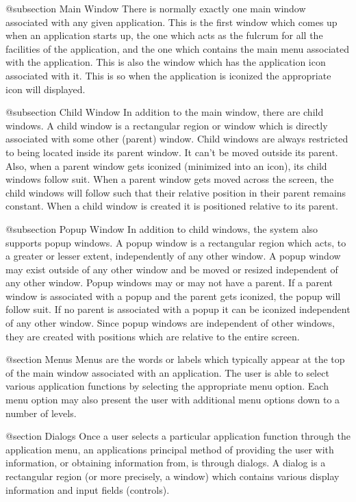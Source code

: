 @subsection Main Window
There is normally exactly one main window associated with any given
application.  This is the first window which comes up when an application
starts up, the one which acts as the fulcrum for all the facilities of
the application, and the one which contains the main menu associated with
the application.  This is also the window which has the application icon
associated with it.  This is so when the application is iconized the
appropriate icon will displayed.

@subsection Child Window
In addition to the main window, there are child windows.  A child window
is a rectangular region or window which is directly associated with
some other (parent) window.  Child windows are always restricted to being
located inside its parent window.  It can't be moved outside its parent.
Also, when a parent window gets iconized (minimized into an icon), its
child windows follow suit.  When a parent window gets moved across the
screen, the child windows will follow such that their relative position
in their parent remains constant.  When a child window is created it
is positioned relative to its parent.  

@subsection Popup Window
In addition to child windows, the system also supports popup windows.  A
popup window is a rectangular region which acts, to a greater or lesser
extent, independently of any other window.  A popup window may exist
outside of any other window and be moved or resized independent of any
other window.  Popup windows may or may not have a parent.  If a parent
window is associated with a popup and the parent gets iconized, the
popup will follow suit.  If no parent is associated with a popup it can
be iconized independent of any other window.  Since popup windows are
independent of other windows, they are created with positions which are
relative to the entire screen.

@section Menus
Menus are the words or labels which typically appear at the top of the
main window associated with an application.  The user is able to select
various application functions by selecting the appropriate menu option.
Each menu option may also present the user with additional menu options
down to a number of levels.

@section Dialogs
Once a user selects a particular application function through the
application menu, an applications principal method of providing the user
with information, or obtaining information from, is through dialogs.  A
dialog is a rectangular region (or more precisely, a window) which
contains various display information and input fields (controls).

